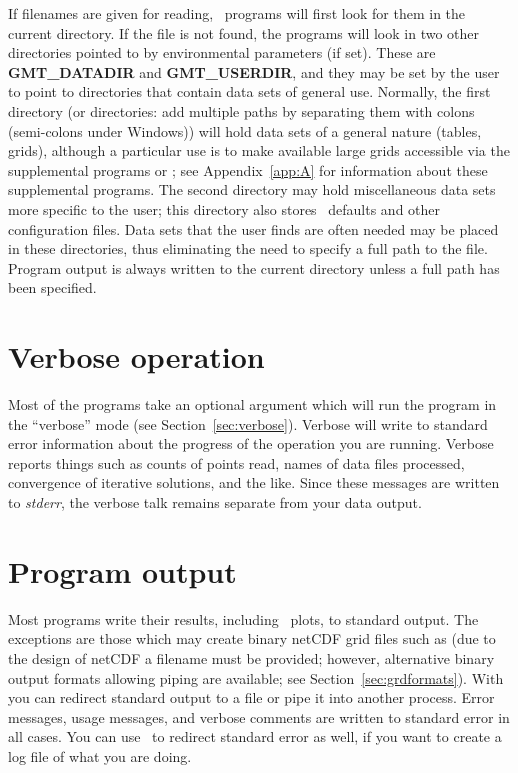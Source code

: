 If filenames are given for reading, \GMT\ programs will first look for them in the
current directory.  If the file is not found, the programs
will look in two other directories pointed to by environmental
parameters (if set).  These are \textbf{GMT\_DATADIR} and
\textbf{GMT\_USERDIR}, and they may be set by the user to point to directories
that contain data sets of general use.  Normally, the first directory (or directories:
add multiple paths by separating them with colons (semi-colons under Windows)) will
hold data sets of a general nature (tables, grids), although a particular use
is to make available large grids accessible via the supplemental programs 
or ; see Appendix~\ref{app:A} for information
about these supplemental programs.  The second directory may hold miscellaneous
data sets more specific to the user; this directory also stores \GMT\ defaults and other
configuration files.  Data sets that the user finds are often needed
may be placed in these directories, thus eliminating the need to specify
a full path to the file.  Program output is always written to the
current directory unless a full path has been specified.

\section{Verbose operation}

Most of the programs take an optional  argument
which will run the program in the ``verbose'' mode (see Section~\ref{sec:verbose}).
Verbose will write to standard error information about the progress
of the operation you are running.  Verbose reports things
such as counts of points read, names of data files
processed, convergence of iterative solutions, and the like.
Since these messages are written to \emph{stderr},  the
verbose talk remains separate from your data output. 

\section{Program output}

Most programs write their results, including \PS\
plots, to standard output.  The exceptions are those which may
create binary netCDF grid files such as  (due to
the design of netCDF a filename must be provided; however,
alternative binary output formats allowing piping are available; see Section~\ref{sec:grdformats}).
With \UNIX\, you can redirect standard output to a file or pipe it
into another process.  Error messages, usage messages, and
verbose comments are written to standard error in all cases.
You can use \UNIX\ to redirect standard error as well,
if you want to create a log file of what you are doing. 

